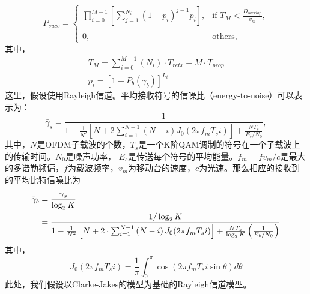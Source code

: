 \begin{equation}
P_{succ}=\left\{
\begin{array}{ll}
\prod_{i=0}^{M-1}\left[\sum_{j=1}^{N_{i}}(1-p_{i})^{j-1}p_{i}\right],
& \mbox{if }T_{M}<\frac{D_{overlap}}{v_{m}},\\
\\0, & \mbox{others},
\end{array}\right.\label{eq:chap_iccs_handover_algorithm_Pro_basic_final00}
\end{equation}
其中，
\begin{align*}
T_{M}=\sum_{i=0}^{M-1}(N_{i})\cdot T_{retx}+M\cdot T_{prop} \\
p_{i}=[1-P_{b}(\gamma_{b})]^{L_{i}}
\end{align*}
这里，假设使用Rayleigh信道。平均接收符号的信噪比（energy-to-noise）可以表示为：\cite{GLST:PMC2002}\cite{Leung:WCNC2005}
\begin{equation}
\bar{\gamma}_{s}=\frac{1}{1-\frac{1}{N^{2}}\left[N+2\sum_{i=1}^{N-1}\left(N-i\right)J_{0}(2\pi f_{m}T_{s}i) \right]
+\frac{NT_{s}}{E_s/N_{0}}},
\end{equation}
其中，$N$是OFDM子载波的个数，$T_s$是一个K阶QAM调制的符号在一个子载波上的传输时间。$N_0$是噪声功率， $E_s$是传送每个符号的平均能量。$f_{m}=fv_{m}/c $是最大的多谱勒频偏，$f$为载波频率，$v_m$为移动台的速度，$c$为光速。那么相应的接收到的平均比特信噪比为
\begin{align}
\bar{\gamma}_{b}&= \frac{ \bar{\gamma}_s} {\log_2K} \notag\\
&=\frac{1/\log_{2}K}{1-\frac{1}{N^{2}}\left[N+2\cdot \sum_{i=1}^{N-1}\left(N-i\right) J_{0}(2\pi f_{m}T_{s}i) \right]
+\frac{NT_{s}}{\log_{2}K}\left(\frac{1}{E_{b}/N_{0}}\right)}
\label{eqn:chap_handover:avg_snr}
\end{align}
其中，
\begin{equation*}
J_{0}(2\pi f_{m}T_{s}i) = \frac{1}{\pi}\int_0^\pi \cos(2\pi f_m T_{s}i \sin \theta) d \theta
\end{equation*}
此处，我们假设以Clarke-Jakes的模型为基础的Rayleigh信道模型。

